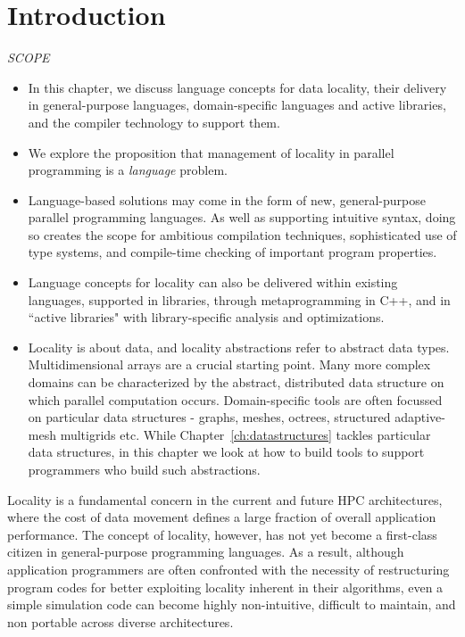\section{Introduction}

{\it
SCOPE
  \begin{itemize}
  \item In this chapter, we discuss language concepts for data locality, their delivery in general-purpose languages, domain-specific languages and active libraries, and the compiler technology to support them.
  \item We explore the proposition that management of locality in parallel programming is a \emph{language} problem.
  \item Language-based solutions may come in the form of new, general-purpose parallel programming languages.  As well as supporting intuitive syntax, doing so creates the scope for ambitious compilation techniques, sophisticated use of type systems, and compile-time checking of important program properties.  
  \item Language concepts for locality can also be delivered within existing languages, supported in libraries, through metaprogramming in C++, and in ``active libraries" with library-specific analysis and optimizations.
  \item Locality is about data, and locality abstractions refer to abstract data types.  Multidimensional arrays are a crucial starting point.  Many more complex domains can be characterized by the abstract, distributed data structure on which parallel computation occurs.  Domain-specific tools are often focussed on particular data structures - graphs, meshes, octrees, structured adaptive-mesh multigrids etc.  While Chapter~\ref{ch:datastructures} tackles particular data structures, in this chapter we look at how to build tools to support programmers who build such abstractions.
  \end{itemize}
}

Locality is a fundamental concern in the current and future HPC architectures, where the cost of data movement defines a large fraction of overall application performance. The concept of locality, however, has not yet become a first-class citizen in general-purpose programming languages. As a result, although application programmers are often confronted with the necessity of restructuring program codes for better exploiting locality inherent in their algorithms, even a simple simulation code can become highly non-intuitive, difficult to maintain, and non portable across diverse architectures. 

